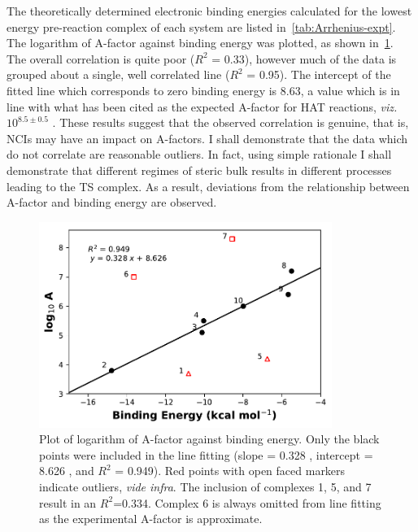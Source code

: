 The theoretically determined electronic binding energies calculated for the lowest energy pre-reaction complex of each system are listed in~\ref{tab:Arrhenius-expt}. The logarithm of A-factor against binding energy was plotted, as shown in~\ref{fig:Arrhenius}. The overall correlation is quite poor ($R^2$ = 0.33), however much of the data is grouped about a single, well correlated line ($R^2$ = 0.95). The intercept of the fitted line which corresponds to zero binding energy is 8.63, a value which is in line with what has been cited as the expected A-factor for HAT reactions, \emph{viz. }$10^{8.5\pm0.5}$ \Ms.\cite{Benson1976} These results suggest that the observed correlation is genuine, that is, NCIs may have an impact on A-factors. I shall demonstrate that the data which do not correlate are reasonable outliers. In fact, using simple rationale I shall demonstrate that different regimes of steric bulk results in different processes leading to the TS complex. As a result, deviations from the relationship between A-factor and binding energy are observed.

\begin{figure}[!htbp]
  \centering
  \includegraphics[width=0.85\textwidth]{figures/arrhenius-scatter.pdf}
  \caption[Plot of logarithm of A-factor against binding energy.]{Plot of logarithm of A-factor against binding energy. Only the black points were included in the line fitting (slope = 0.328 \kcalmol, intercept = 8.626 \kcalmol, and $R^2$ = 0.949). Red points with open faced markers indicate outliers, \emph{vide infra}. The inclusion of complexes 1, 5, and 7 result in an $R^2$=0.334. Complex 6 is always omitted from line fitting as the experimental A-factor is approximate.}
\label{fig:Arrhenius}
\end{figure}

